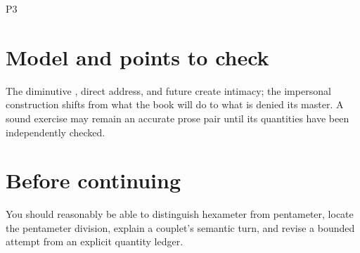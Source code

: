 \begin{courseunit}{P3}
\ifsolutions
\section{Model and points to check}
The diminutive , direct address, and future create intimacy; the
impersonal construction shifts from what the book will do to what is denied
its master. A sound exercise may remain an accurate prose pair until its
quantities have been independently checked.
\else
\section{Before continuing}
You should reasonably be able to distinguish hexameter from pentameter, locate
the pentameter division, explain a couplet's semantic turn, and revise a
bounded attempt from an explicit quantity ledger.
\fi
\end{courseunit}

